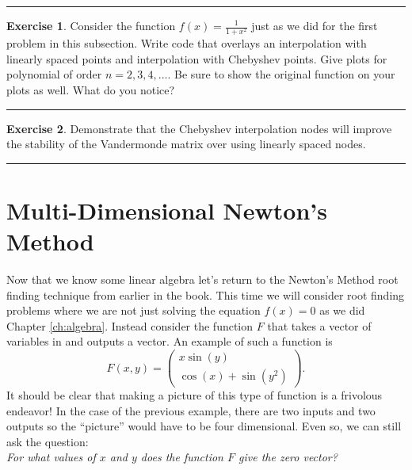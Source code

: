 \documentclass[
]{book}
\theoremstyle{definition}
\theoremstyle{definition}
\theoremstyle{definition}
\newtheorem{exercise}{Exercise}[chapter]
\theoremstyle{remark}
\begin{document}
\begin{center}\rule{0.5\linewidth}{0.5pt}\end{center}

\begin{exercise}
\protect\hypertarget{exr:unnamed-chunk-852}{}{\label{exr:unnamed-chunk-852} }Consider the function \(f(x) = \frac{1}{1+x^2}\) just as we did for the first problem in this subsection. Write code that overlays an interpolation with linearly spaced points and interpolation with Chebyshev points. Give plots for polynomial of order \(n=2,3, 4, \ldots\). Be sure to show the original function on your plots as well. What do you notice?
\end{exercise}

\begin{center}\rule{0.5\linewidth}{0.5pt}\end{center}

\begin{exercise}
\protect\hypertarget{exr:unnamed-chunk-853}{}{\label{exr:unnamed-chunk-853} }Demonstrate that the Chebyshev interpolation nodes will improve the stability of the Vandermonde matrix over using linearly spaced nodes.
\end{exercise}

\begin{center}\rule{0.5\linewidth}{0.5pt}\end{center}

\hypertarget{sec:mv_newton}{%
\section{Multi-Dimensional Newton's Method}\label{sec:mv_newton}}

Now that we know some linear algebra let's return to the Newton's Method root finding technique from earlier in the book. This time we will consider root finding problems where we are not just solving the equation \(f(x) = 0\) as we did Chapter \ref{ch:algebra}. Instead consider the function \(F\) that takes a vector of variables in and outputs a vector. An example of such a function is
\[F(x,y) = \begin{pmatrix} x\sin(y) \\ \cos(x) + \sin(y^2)
\end{pmatrix}.\]
It should be clear that making a picture of this type of function is a frivolous endeavor! In the case of the previous example, there are two inputs and two outputs so the ``picture'' would have to be four dimensional. Even so, we can still ask the question:\\
\emph{For what values of \(x\) and \(y\) does the function \(F\) give the zero vector?}
\end{document}
